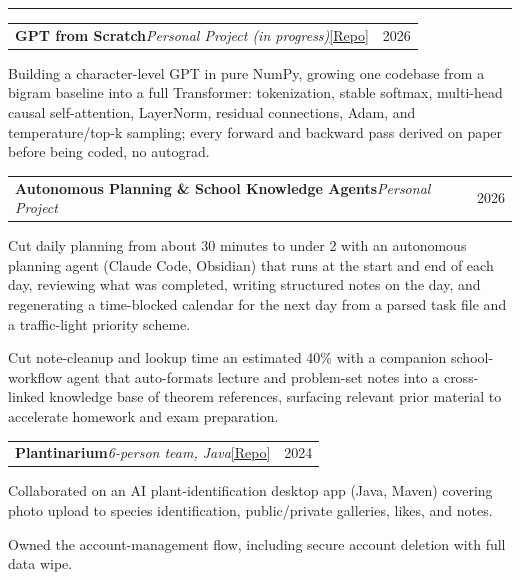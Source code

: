 \documentclass[letterpaper,10pt]{article}
\makeatletter
\newcommand{\Section}[1]{\vspace{4pt}{\large\bfseries #1}\vspace{1pt}\hrule\vspace{3pt}}
\newcommand{\projentry}[2]{%
  \vspace{2pt}%
  \begin{tabular*}{\textwidth}{@{}l@{\extracolsep{\fill}}r@{}}
    #1 & #2 \\
  \end{tabular*}\vspace{-4pt}}
\newenvironment{bullets}%
  {\begin{list}{\textbullet}{%
     \setlength{\leftmargin}{1.3em}\setlength{\labelsep}{0.5em}%
     \setlength{\itemsep}{1.5pt}\setlength{\topsep}{2pt}%
     \setlength{\parsep}{0pt}\setlength{\partopsep}{0pt}}}%
  {\end{list}}
\makeatother
\begin{document}
\Section{Projects}
\projentry{\textbf{GPT from Scratch}\quad\textit{Personal Project (in progress)}\quad\href{https://github.com/Avi-Gobrin/tiny-gpt-from-scratch}{[Repo]}}{2026}
\begin{bullets}
  \item Building a character-level GPT in pure NumPy, growing one codebase from a bigram baseline into a full Transformer: tokenization, stable softmax, multi-head causal self-attention, LayerNorm, residual connections, Adam, and temperature/top-k sampling; every forward and backward pass derived on paper before being coded, no autograd.
\end{bullets}
\projentry{\textbf{Autonomous Planning \& School Knowledge Agents}\quad\textit{Personal Project}}{2026}
\begin{bullets}
  \item Cut daily planning from about 30 minutes to under 2 with an autonomous planning agent (Claude Code, Obsidian) that runs at the start and end of each day, reviewing what was completed, writing structured notes on the day, and regenerating a time-blocked calendar for the next day from a parsed task file and a traffic-light priority scheme.
  \item Cut note-cleanup and lookup time an estimated 40\% with a companion school-workflow agent that auto-formats lecture and problem-set notes into a cross-linked knowledge base of theorem references, surfacing relevant prior material to accelerate homework and exam preparation.
\end{bullets}
\projentry{\textbf{Plantinarium}\quad\textit{6-person team, Java}\quad\href{https://github.com/barnaste/plantinarium}{[Repo]}}{2024}
\begin{bullets}
  \item Collaborated on an AI plant-identification desktop app (Java, Maven) covering photo upload to species identification, public/private galleries, likes, and notes.
  \item Owned the account-management flow, including secure account deletion with full data wipe.
\end{bullets}
\end{document}
